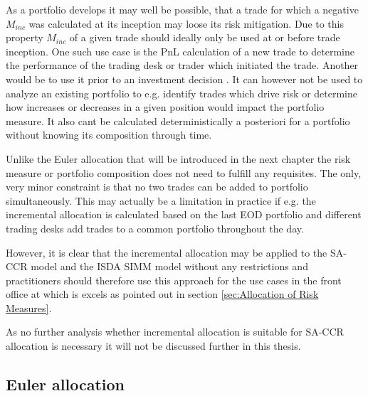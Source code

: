 \documentclass[../Thesis_AHoecherl.tex]{subfiles}
\begin{document}
As a portfolio develops it may well be possible, that a trade for which a negative $M_{inc}$ was calculated at its inception may loose its risk mitigation. 
Due to this property $M_{inc}$ of a given trade should ideally only be used at or before trade inception. 
One such use case is the \gls{PnL} calculation of a new trade to determine the performance of the trading desk or trader which initiated the trade. 
Another would be to use it prior to an investment decision \cite{tibiletti2001incremental}. 
It can however not be used to analyze an existing portfolio to e.g. identify trades which drive risk or determine how increases or decreases in a given position would impact the portfolio measure. 
It also cant be calculated deterministically a posteriori for a portfolio without knowing its composition through time.

Unlike the Euler allocation that will be introduced in the next chapter the risk measure or portfolio composition does not need to fulfill any requisites. The only, very minor constraint is that no two trades can be added to portfolio simultaneously.
This may actually be a limitation in practice if e.g. the incremental allocation is calculated based on the last EOD portfolio and different trading desks add trades to a common portfolio throughout the day.

However, it is clear that the incremental allocation may be applied to the \gls{SA-CCR} model and the \gls{ISDA SIMM} model without any restrictions and practitioners should therefore use this approach for the use cases in the front office at which is excels as pointed out in section \ref{sec:Allocation of Risk Measures}.

As no further analysis whether incremental allocation is suitable for \gls{SA-CCR} allocation is necessary it will not be discussed further in this thesis.


\subsection{Euler allocation}\label{sec:Euler allocation}
\end{document}
